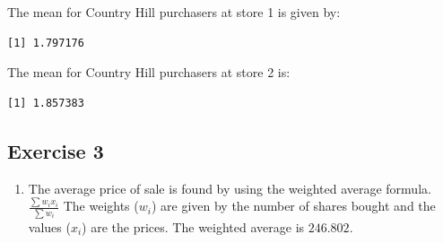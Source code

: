\documentclass[
  letterpaper,
  DIV=11,
  numbers=noendperiod]{scrreprt}
\newenvironment{Shaded}{\begin{snugshade}}{\end{snugshade}}
\newcommand{\DecValTok}[1]{\textcolor[rgb]{0.68,0.00,0.00}{#1}}
\newcommand{\FunctionTok}[1]{\textcolor[rgb]{0.28,0.35,0.67}{#1}}
\newcommand{\NormalTok}[1]{\textcolor[rgb]{0.00,0.23,0.31}{#1}}
\newcommand{\SpecialCharTok}[1]{\textcolor[rgb]{0.37,0.37,0.37}{#1}}
\newcommand{\StringTok}[1]{\textcolor[rgb]{0.13,0.47,0.30}{#1}}
\providecommand{\tightlist}{%
  \setlength{\itemsep}{0pt}\setlength{\parskip}{0pt}}\usepackage{longtable,booktabs,array}
\begin{document}
The mean for Country Hill purchasers at store 1 is given by:

\begin{Shaded}
\end{Shaded}

\begin{verbatim}
[1] 1.797176
\end{verbatim}

The mean for Country Hill purchasers at store 2 is:

\begin{Shaded}
\end{Shaded}

\begin{verbatim}
[1] 1.857383
\end{verbatim}

\hypertarget{exercise-3-5}{%
\subsection*{Exercise 3}\label{exercise-3-5}}

\begin{blackbox}

\begin{enumerate}
\def\labelenumi{\arabic{enumi}.}
\tightlist
\item
  The average price of sale is found by using the weighted average
  formula. \(\frac{\sum w_{i}x_{i}}{\sum w_{i}}\) The weights
  (\(w_{i}\)) are given by the number of shares bought and the values
  (\(x_{i}\)) are the prices. The weighted average is \(246.802\).
\end{enumerate}

\end{blackbox}
\end{document}
